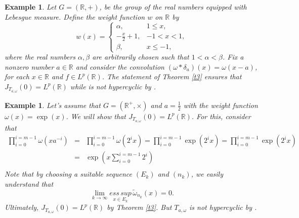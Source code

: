 \documentclass{amsart}
\newtheorem{exam}[thm]{Example}
\theoremstyle{definition}\newtheorem{defn}[thm]{Definition}
\theoremstyle{remark}
\numberwithin{equation}{section}
\begin{document}
\begin{exam}
Let $G=(\mathbb{R}, +)$, be the group of the real numbers equipped
with  Lebesgue measure.  Define the weight function $w$ on
$\mathbb{R}$ by
$$w(x)=\left\{
  \begin{array}{ll}
   \alpha, & {1\leq x}, \\
        -\frac{x}{2}+1, & {-1< x < 1},\\
    \beta, &{x\leq -1} ,
  \end{array}
\right.$$  where the real numbers $\alpha,\beta$ are arbitrarily
chosen such that $1<\alpha <\beta$. Fix a  nonzero number $a\in
\mathbb{R}$ and consider the convolution
$(\omega*\delta_{a})(x)=\omega(x- a)$, for each $x\in \mathbb{R}$
and $f\in L^p(\mathbb{R})$.  The statement of Theorem \ref{t3}
ensures that $J_{T_{a,\omega}}(0)=L^p(\mathbb{R})$ while is not
hypercyclic by \cite[Theorem 2.2]{chu}.
 \end{exam}
\begin{exam}
Let's assume that $ G = (\mathbb{R}^+,\times) $ and $ a =\frac{1}{2}
$ with the weight function $ \omega(x) = \exp(x)$. We will show that
$J_{T_{a,\omega}}(0)=L^p(\mathbb{R})$. For this, consider that
 \begin{eqnarray*}
\prod_{i=0}^{i=m-1}\omega(xa^{-i})&=&\prod_{i=0}^{i=m-1}\omega(2^{i}x)
 =\prod_{i=0}^{i=m-1}\exp(2^{i}x)=\prod_{i=0}^{i=m-1}\exp(2^{i}x) \\
&=&\exp(x\sum_{i=0}^{i=m-1}2^{i})\\
\end{eqnarray*}
Note that by choosing a suitable sequence  $(E_k)$ and $(n_k)$, we
easily understand that   $$ \lim_{k\rightarrow \infty}\underset{x\in
E_{k}}{ess\,sup}\, \tilde{\omega}_{n_k}(x)=0.
$$ Ultimately,
$J_{T_{a,\omega}}(0)=L^p(\mathbb{R})$ by Theorem \ref{t3}. But
$T_{a,\omega}$ is not hypercyclic by \cite[Theorem 2.2]{chu}.
\end{exam}
\end{document}
